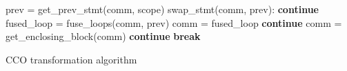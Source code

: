 \begin{algorithm}
{\begin{algorithmic}
      \State prev = get\_prev\_stmt(comm, scope) %
        \State swap\_stmt(comm, prev):  %
        \State \textbf{continue}
      \EndIf
        \State fused\_loop = fuse\_loops(comm, prev) %
        \State comm = fused\_loop
        \State \textbf{continue}
      \EndIf
    \EndIf
      \State comm = get\_enclosing\_block(comm)
      \State \textbf{continue}
    \EndIf
    \State \textbf{break}
  \EndWhile
\EndFunction

\end{algorithmic}
\caption{CCO transformation algorithm}
\label{alg:cco}
}%
\end{algorithm}

